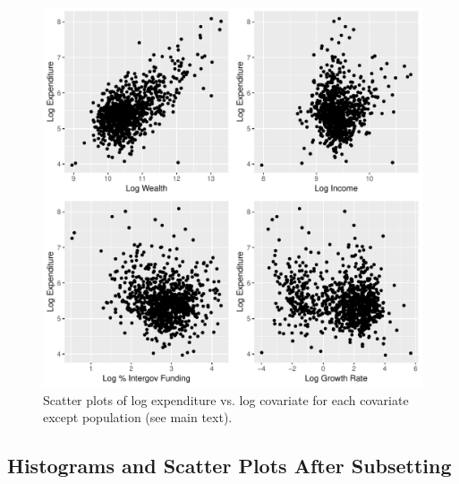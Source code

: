 \documentclass{article}\usepackage[]{graphicx}\usepackage[]{color}
\makeatletter
\def\maxwidth{ %
  \ifdim\Gin@nat@width>\linewidth
    \linewidth
  \else
    \Gin@nat@width
  \fi
}
\newenvironment{knitrout}{}{} %
\makeatother
\begin{document}
\begin{appendices}
\begin{knitrout}
\color{fgcolor}\begin{figure}
\includegraphics[width=\maxwidth]{figure/r_append_scatter-1} \caption[Scatter plots of log expenditure vs]{Scatter plots of log expenditure vs. log covariate for each covariate except population (see main text).}\label{fig:r append_scatter}
\end{figure}


\end{knitrout}


\newpage
\subsection{Histograms and Scatter Plots After Subsetting} \label{append-after-subset}



\end{appendices}
\end{document}
